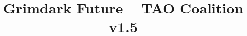 \documentclass[10pt]{article}
\title{Grimdark Future – TAO Coalition v1.5}
\begin{document}
\maketitle


\begin{multicols*}{3}[]
	\begin{center}


	\end{center}
\end{multicols*}
\pagebreak

\begin{multicols*}{3}[]
	\begin{center}


	\end{center}
\end{multicols*}
\end{document}
